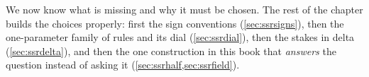 We now know what is missing and why it must be chosen.  The rest of
the chapter builds the choices properly: first the sign conventions
(\cref{sec:ssrsigns}), then the one-parameter family
of rules and its dial (\cref{sec:ssrdial}), then the stakes in
delta (\cref{sec:ssrdelta}), and then the one construction in this
book that \emph{answers} the question instead of asking it
(\cref{sec:ssrhalf,sec:ssrfield}).
